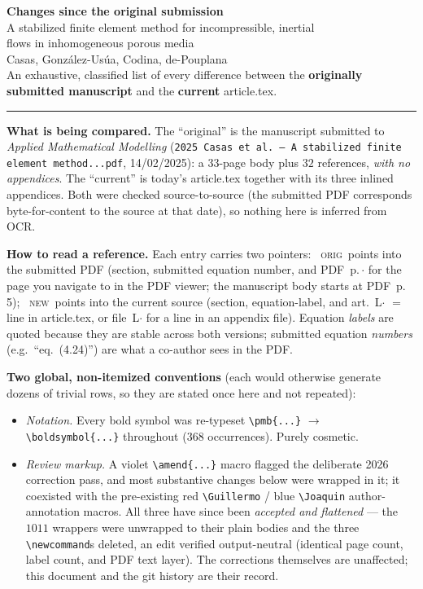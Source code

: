 \documentclass[11pt]{article}
\newcommand{\Orig}{\textcolor{origc}{\footnotesize\textsc{orig}}}
\newcommand{\New}{\textcolor{newc}{\footnotesize\textsc{new}}}
\newcommand{\code}[1]{\textcolor{newc}{\ttfamily\small #1}}
\newcommand{\pdfp}[1]{PDF~p.\,#1}
\newcommand{\artl}[1]{art.\ L#1}       %
\newcommand{\appl}[2]{#1~L#2}          %
\begin{document}
\begin{center}
  {\LARGE\bfseries\color{headc} Changes since the original submission}\\[4pt]
  {\large A stabilized finite element method for incompressible, inertial\\
   flows in inhomogeneous porous media}\\[8pt]
  {\normalsize Casas, Gonz\'alez-Us\'ua, Codina, de-Pouplana}\\[6pt]
  {\small An exhaustive, classified list of every difference between the
   \textbf{originally submitted manuscript} and the \textbf{current} \code{article.tex}.}
\end{center}

\vspace{0.4em}
\hrule
\vspace{0.8em}

\noindent\textbf{What is being compared.}
The ``original'' is the manuscript submitted to \emph{Applied Mathematical Modelling}
(\texttt{2025 Casas et al.\ – A stabilized finite element method...pdf}, 14/02/2025): a $33$-page body plus $32$ references,
\emph{with no appendices}. The ``current'' is today's \code{article.tex} together with its
three inlined appendices. Both were checked source-to-source (the submitted PDF corresponds
byte-for-content to the source at that date), so nothing here is inferred from OCR.

\noindent\textbf{How to read a reference.}
Each entry carries two pointers:
\ \Orig\ points into the submitted PDF (section, submitted equation number, and \pdfp{$\cdot$}
for the page you navigate to in the PDF viewer; the manuscript body starts at \pdfp{5});
\ \New\ points into the current source (section, \code{equation-label}, and \artl{$\cdot$}
$=$ line in \code{article.tex}, or \appl{file}{$\cdot$} for a line in an appendix file).
Equation \emph{labels} are quoted because they are stable across both versions; submitted
equation \emph{numbers} (e.g.\ ``eq.~(4.24)'') are what a co-author sees in the PDF.

\noindent\textbf{Two global, non-itemized conventions} (each would otherwise generate dozens of
trivial rows, so they are stated once here and not repeated):
\begin{itemize}[itemsep=2pt,topsep=2pt]
  \item \emph{Notation.} Every bold symbol was re-typeset \verb|\pmb{...}| $\to$
        \verb|\boldsymbol{...}| throughout ($368$ occurrences). Purely cosmetic.
  \item \emph{Review markup.} A violet \verb|\amend{...}| macro flagged the deliberate 2026
        correction pass, and \textcolor{amend}{most substantive changes below were wrapped in it};
        it coexisted with the pre-existing red \verb|\Guillermo| / blue \verb|\Joaquin|
        author-annotation macros. All three have since been \emph{accepted and flattened} ---
        the $1011$ wrappers were unwrapped to their plain bodies and the three
        \verb|\newcommand|s deleted, an edit verified output-neutral (identical page count,
        label count, and PDF text layer). The corrections themselves are unaffected; this
        document and the git history are their record.
\end{itemize}
\end{document}
